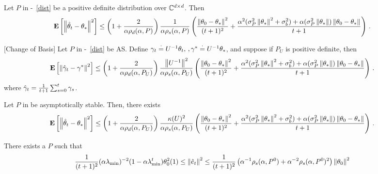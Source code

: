 \begin{theorem}\label{th:pdrate}
Let $P$ in -~\ref{dist} be a positive definite distribution over $\mathbb{C}^{d \times d}$. Then
\begin{align*}
\mathbf{E}\left[\left\| \hat{\theta}_t-\theta_*\right\|^2\right]
\leq
\left(1+\frac2{\alpha\rho_d(\alpha,P)}\right)\frac{1}{\alpha \rho_s(\alpha,P)}
\left(\frac{\left\| \theta_0-\theta_*\right\|^2}{(t+1)^2}+ \frac{\alpha^2(\sigma_P^2\left\| \theta_*\right\|^2+\sigma_b^2)+\alpha (\sigma_P^2\left\| \theta_*\right\|)\left\| \theta_0-\theta_*\right\|}{t+1} \right)\,.
\end{align*}

\end{theorem}
\begin{theorem}\label{thm:simtran}[Change of Basis]
Let $P$ in -~\ref{dist} be AS. Define $\gamma_t\stackrel{\cdot}{=} U^{-1}\theta_t,\,,\gamma^*\stackrel{\cdot}{=} U^{-1}\theta_*$, and suppose if $P_U$ is positive definite, then
\begin{align*}
\mathbf{E}\left[\left\| \hat{\gamma}_t-\gamma^*\right\|^2\right]
\leq
\left(1+\frac2{\alpha\rho_d(\alpha,P_U)}\right)\frac{\left\| U^{-1}\right\|^2}{\alpha \rho_s(\alpha,P_U)}
\left(\frac{\left\| \theta_0-\theta_*\right\|^2}{(t+1)^2}+ \frac{\alpha^2(\sigma_P^2\left\| \theta_*\right\|^2+\sigma_b^2)+\alpha (\sigma_P^2\left\| \theta_*\right\|)\left\| \theta_0-\theta_*\right\|}{t+1} \right)\,.
\end{align*}
where $\hat{\gamma}_t=\frac{1}{t+1}\sum_{s=0}^t \gamma_s$.
\end{theorem}
\begin{corollary}\label{cor:as}
Let $P$ in  be asymptotically stable. Then, there exists
\begin{align*}
\mathbf{E}\left[\left\| \hat{\theta}_t-\theta_*\right\|^2\right]
\leq
\left(1+\frac2{\alpha\rho_d(\alpha,P_U)}\right)\frac{\kappa(U)^2}{\alpha \rho_s(\alpha,P_U)}
\left(\frac{\left\| \theta_0-\theta_*\right\|^2}{(t+1)^2}+ \frac{\alpha^2(\sigma_P^2\left\| \theta_*\right\|^2+\sigma_b^2)+\alpha (\sigma_P^2\left\| \theta_*\right\|)\left\| \theta_0-\theta_*\right\|}{t+1} \right)\,.
\end{align*}
\end{corollary}
\begin{theorem}
There exists a $P$ such that
\begin{align}
\frac{1}{(t+1)^2}(\alpha \lambda_{\min})^{-2}(1-\alpha \lambda_{\min}^t) \theta^2_0(1)\leq \left\| \hat{e}_t\right\|^2\leq
\frac{1}{(t+1)^2} \left(\alpha^{-1}\rho_s(\alpha,P^0)+\alpha^{-2}\rho_s(\alpha,P^0)^2\right)\left\| \theta_0\right\|^2
\end{align}

\end{theorem}
